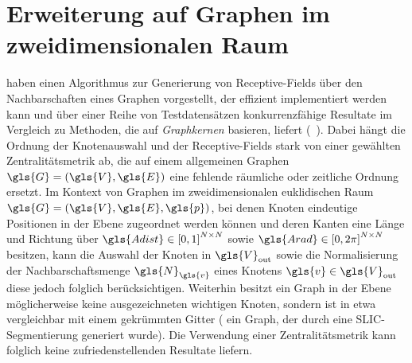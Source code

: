 \section{Erweiterung auf Graphen im zweidimensionalen Raum}
\label{raeumliche_erweiterung}

\citeauthor{patchy} haben einen Algorithmus zur Generierung von Receptive-Fields über den Nachbarschaften eines Graphen vorgestellt, der effizient implementiert werden kann und über einer Reihe von Testdatensätzen konkurrenzfähige Resultate im Vergleich zu Methoden, die auf \emph{Graphkernen} basieren, liefert (\vgl{}~\cite{patchy}).
Dabei hängt die Ordnung der Knotenauswahl und der Receptive-Fields stark von einer gewählten Zentralitätsmetrik ab, die auf einem allgemeinen Graphen $\gls{G} = \left(\gls{V}, \gls{E}\right)$ eine fehlende räumliche oder zeitliche Ordnung ersetzt.
Im Kontext von Graphen im zweidimensionalen euklidischen Raum $\gls{G} = \left(\gls{V}, \gls{E}, \gls{p}\right)$, bei denen Knoten eindeutige Positionen in der Ebene zugeordnet werden können und deren Kanten eine Länge und Richtung über $\gls{Adist} \in {\left[0, 1\right]}^{N \times N}$ sowie $\gls{Arad} \in {\left[0, 2\pi\right]}^{N \times N}$ besitzen, kann die Auswahl der Knoten in $\gls{V}_{\mathrm{out}}$ sowie die Normalisierung der Nachbarschaftsmenge $\gls{N}_{\gls{v}}$ eines Knotens $\gls{v} \in \gls{V}_{\mathrm{out}}$ diese jedoch folglich berücksichtigen.
Weiterhin besitzt ein Graph in der Ebene möglicherweise keine ausgezeichneten \bzw{} wichtigen Knoten, sondern ist in etwa vergleichbar mit einem gekrümmten Gitter (\zB{} ein Graph, der durch eine \gls{SLIC}-Segmentierung generiert wurde).
Die Verwendung einer Zentralitätsmetrik kann folglich keine zufriedenstellenden Resultate liefern.

